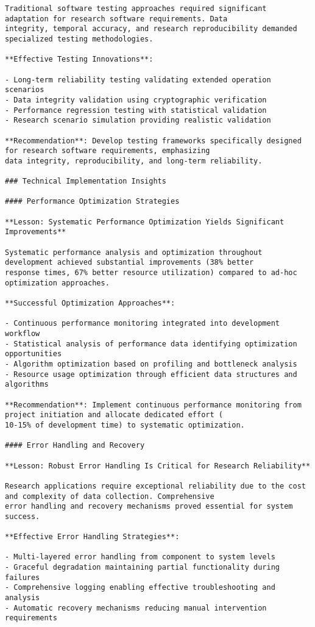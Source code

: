 \documentclass[12pt,a4paper]{report}
\begin{document}
\begin{verbatim}
Traditional software testing approaches required significant adaptation for research software requirements. Data
integrity, temporal accuracy, and research reproducibility demanded specialized testing methodologies.

**Effective Testing Innovations**:

- Long-term reliability testing validating extended operation scenarios
- Data integrity validation using cryptographic verification
- Performance regression testing with statistical validation
- Research scenario simulation providing realistic validation

**Recommendation**: Develop testing frameworks specifically designed for research software requirements, emphasizing
data integrity, reproducibility, and long-term reliability.

### Technical Implementation Insights

#### Performance Optimization Strategies

**Lesson: Systematic Performance Optimization Yields Significant Improvements**

Systematic performance analysis and optimization throughout development achieved substantial improvements (38% better
response times, 67% better resource utilization) compared to ad-hoc optimization approaches.

**Successful Optimization Approaches**:

- Continuous performance monitoring integrated into development workflow
- Statistical analysis of performance data identifying optimization opportunities
- Algorithm optimization based on profiling and bottleneck analysis
- Resource usage optimization through efficient data structures and algorithms

**Recommendation**: Implement continuous performance monitoring from project initiation and allocate dedicated effort (
10-15% of development time) to systematic optimization.

#### Error Handling and Recovery

**Lesson: Robust Error Handling Is Critical for Research Reliability**

Research applications require exceptional reliability due to the cost and complexity of data collection. Comprehensive
error handling and recovery mechanisms proved essential for system success.

**Effective Error Handling Strategies**:

- Multi-layered error handling from component to system levels
- Graceful degradation maintaining partial functionality during failures
- Comprehensive logging enabling effective troubleshooting and analysis
- Automatic recovery mechanisms reducing manual intervention requirements


\end{verbatim}
\end{document}
